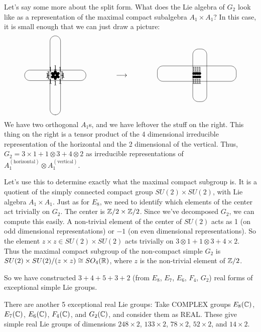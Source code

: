 \begin{example}
   Let's say some more about the split form. What does the Lie algebra of $G_2$ look
   like as a representation of the maximal compact subalgebra $A_1 \times A_1$? In
   this case, it is small enough that we can just draw a picture:
   \[\begin{xy}
     (0,0) *{2};
     a(0) *++!L{1} *{\bullet};
     a(60) *+!DL{1} *{\bullet};
     a(120) *+!DR{1} *{\bullet};
     a(180) *++!R{1} *{\bullet};
     a(240) *+!UR{1} *{\bullet};
     a(300) *+!UL{1} *{\bullet};
     a(60)+a(120) *+!D{1} *{\bullet};
     a(180)+a(240) *+!R{1} **@{.} *{\bullet};
     a(300)+a(0) *+!L{1} **@{.} *{\bullet};
     a(60)+a(120) **@{.};
     a(60)+a(0) *+!L{1} *{\bullet};
     a(180)+a(120) *+!R{1} **@{.} *{\bullet};
     a(300)+a(240) *+!U{1} **@{.} *{\bullet};
     a(60)+a(0) **@{.};
     (0,0) *=<8.75em,1.5em>\frm<8pt>{-} *=<1.5em,11.25em>\frm<8pt>{-};
   \end{xy} \qquad \qquad \longrightarrow \qquad \qquad
   \begin{xy}
     (0,0);
     a(60) *+!D{1} *{\bullet};
     a(120) *+!D{1} *{\bullet};
     a(240) *+!U{1} *{\bullet};
     a(300) *+!U{1} *{\bullet};
     a(60)+a(120);
     a(180)+a(240) *+!U{1} *{\bullet} **@{.};
     a(300)+a(0) *+!U{1} *{\bullet} **@{.};
     a(60)+a(120) **@{.};
     a(60)+a(0) *+!D{1} *{\bullet};
     a(180)+a(120) *+!D{1} *{\bullet} **@{.};
     a(300)+a(240) **@{.};
     a(60)+a(0) **@{.};
     (0,\halfrootthree) *=<11.25em,2.2em>\frm<8pt>{-};
     (1.5,0) *=<2em,7.5em>\frm<8pt>{-};
   \end{xy}\]
   We have two orthogonal $A_1$s, and we have leftover the stuff on the right. This
   thing on the right is a tensor product of the 4 dimensional irreducible
   representation of the horizontal and the 2 dimensional of the vertical. Thus, $G_2=
   3\times 1 + 1\otimes 3 + 4\otimes 2$ as irreducible representations of
   $A_1^{(\mathrm{horizontal})} \otimes A_1^{(\mathrm{vertical})}$.

   Let's use this to determine exactly what the maximal compact subgroup is. It is a
   quotient of the simply connected compact group $SU(2)\times SU(2)$, with Lie
   algebra $A_1\times A_1$. Just as for $E_8$, we need to identify which elements of
   the center act trivially on $G_2$. The center is $\mathbb{Z}/2\times \mathbb{Z}/2$. Since we've
   decomposed $G_2$, we can compute this easily. A non-trivial element of the center
   of $SU(2)$ acts as 1 (on odd dimensional representations) or $-1$ (on even
   dimensional representations). So the element $z\times z\in SU(2)\times SU(2)$ acts
   trivially on $3\otimes 1 + 1\otimes 3 + 4\times 2$. Thus the maximal compact
   subgroup of the non-compact simple $G_2$ is $SU(2)\times SU(2)/(z\times z)\cong
   SO_4(\mathbb{R})$, where $z$ is the non-trivial element of $\mathbb{Z}/2$.
 \end{example}

 So we have constructed $3+4+5+3+2$ (from $E_8$, $E_7$, $E_6$, $F_4$, $G_2$) real
 forms of exceptional simple Lie groups.

 There are another 5 exceptional real Lie groups: Take COMPLEX groups $E_8(\mathbb{C})$,
 $E_7(\mathbb{C})$, $E_6(\mathbb{C})$, $F_4(\mathbb{C})$, and $G_2(\mathbb{C})$, and consider them as REAL. These
 give simple real Lie groups of dimensions $248\times 2$, $133\times 2$, $78\times 2$,
 $52 \times 2$, and $14\times 2$.
